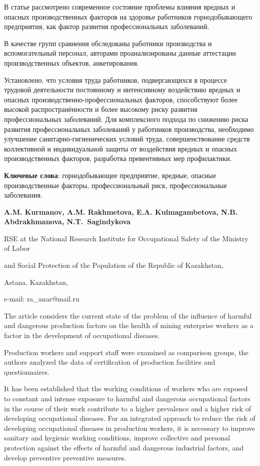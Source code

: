 В статье рассмотрено современное состояние проблемы влияния вредных и
опасных производственных факторов на здоровье работников
горнодобывающего предприятия, как фактор развития профессиональных
заболеваний.

В качестве групп сравнения обследованы работники производства и
вспомогательный персонал, авторами проанализированы данные аттестации
производственных объектов, анкетирования.

Установлено, что условия труда работников, подвергающихся в процессе
трудовой деятельности постоянному и интенсивному воздействию вредных и
опасных производственно-профессиональных факторов, способствуют более
высокой распространённости и более высокому риску развития
профессиональных заболеваний. Для комплексного подхода по снижению риска
развития профессиональных заболеваний у работников производства,
необходимо улучшение санитарно-гигиенических условий труда,
совершенствование средств коллективной и индивидуальной защиты от
воздействия вредных и опасных производственных факторов, разработка
превентивных мер профилактики.

{\bfseries Ключевые слова}: горнодобывающее предприятие, вредные, опасные
производственные факторы, профессиональный риск, профессиональные
заболевания.


\begin{center}
{\bfseries A.M. Kurmanov, A.M. Rakhmetova\envelope, E.A. Kulmagambetova, N.B. Abdrakhmanova, N.T.~Sagindykova}

RSE at the National Research Institute for Occupational Safety of the
Ministry of Labor

and Social Protection of the Population of the Republic of Kazakhstan,

Astana, Kazakhstan,

e-mail: ra\_anar@mail.ru
\end{center}

The article considers the current state of the problem of the influence
of harmful and dangerous production factors on the health of mining
enterprise workers as a factor in the development of occupational
diseases.

Production workers and support staff were examined as comparison groups,
the authors analyzed the data of certification of production facilities
and questionnaires.

It has been established that the working conditions of workers who are
exposed to constant and intense exposure to harmful and dangerous
occupational factors in the course of their work contribute to a higher
prevalence and a higher risk of developing occupational diseases. For an
integrated approach to reduce the risk of developing occupational
diseases in production workers, it is necessary to improve sanitary and
hygienic working conditions, improve collective and personal protection
against the effects of harmful and dangerous industrial factors, and
develop preventive preventive measures.

